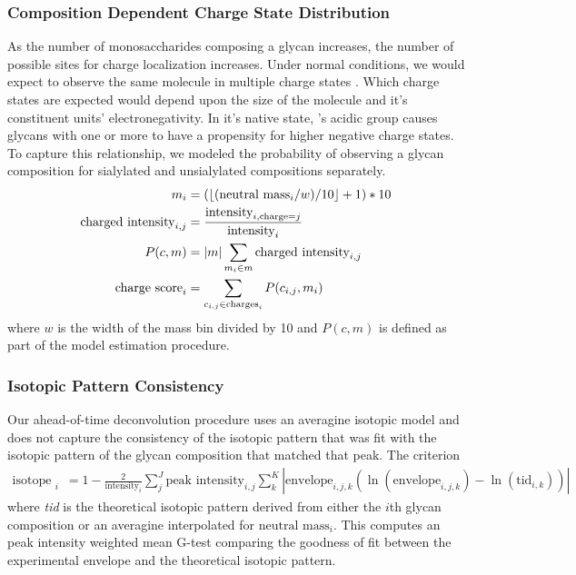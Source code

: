 \documentclass{article}
\DeclarePairedDelimiter\floor{\lfloor}{\rfloor}
\begin{document}
\subsubsection{Composition Dependent Charge State Distribution}
As the number of monosaccharides composing a glycan increases, the number of possible sites
for charge localization increases. Under normal conditions, we would expect to observe the
same molecule in multiple charge states \cite{Maxwell2012}. Which charge states are
expected would depend upon the size of the molecule and it's constituent units'
electronegativity. In it's native state, 's acidic group causes
glycans with one or more  to have a propensity for higher negative
charge states\cite{Varki2009}. To capture this relationship, we modeled the probability of
observing a glycan composition for sialylated and unsialylated compositions separately.
\begin{align}
    m_i &= (\floor*{(\text{neutral mass}_i / w) / 10} + 1) * 10 \\
    \text{charged intensity}_{i,j} &= \frac{
        \text{intensity}_{i, \text{charge}=j}}{\text{intensity}_i} \\
    P(c, m) &= |m|\sum_{m_i \in m} \text{charged intensity}_{i, j} \\
    \text{charge score}_i &= \sum_{c_{i, j} \in \text{charges}_i}{P(c_{i, j}, m_i)} \\
\end{align} where $w$ is the width of the mass bin divided by 10 and $P(c, m)$ is defined as
part of the model estimation procedure.

\subsubsection{Isotopic Pattern Consistency}
Our ahead-of-time deconvolution procedure uses an averagine isotopic model and does not
capture the consistency of the isotopic pattern that was fit with the isotopic pattern
of the glycan composition that matched that peak. The criterion \begin{align}
    \text{isotope score}_i &= 1 - \frac{2}{\text{intensity}_i}\sum_j^J{
        \text{peak intensity}_{i, j}\sum_k^K{
            |\text{envelope}_{i, j, k}(
                \ln(\text{envelope}_{i, j, k}) - \ln(\text{tid}_{i, k})
                )|
        }
    }
\end{align} where {\em tid} is the theoretical isotopic pattern derived from either the $i$th
glycan composition or an averagine interpolated for $\text{neutral mass}_i$. This computes an
peak intensity weighted mean G-test comparing the goodness of fit between the experimental
envelope and the theoretical isotopic pattern.
\end{document}
